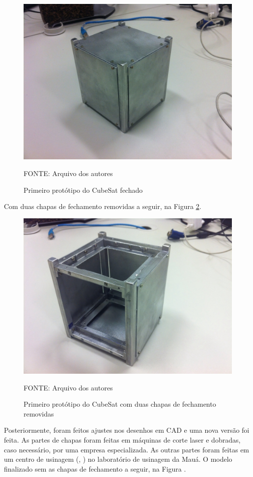 \documentclass[
	12pt,				%
	openany,			%
	twoside,			%
	a4paper,			%
	english,			%
	french,				%
	spanish,			%
	brazil,				%
	oldfontcommands
	]{abntex2}
\begin{document}
\begin{figure}[ht]
	\caption{Primeiro protótipo do CubeSat fechado}
	\centering
	\includegraphics[width=0.7\linewidth]{./figs/PrototypeOne_Full}
	
	\begin{small}
		FONTE: Arquivo dos autores
	\end{small}
	\label{fig:ProtooneF}
\end{figure}

\newpage

Com duas chapas de fechamento removidas a seguir, na Figura \ref{fig:Protoone}.

\begin{figure}[ht]
	\caption{Primeiro protótipo do CubeSat com duas chapas de fechamento removidas}
	\centering
	\includegraphics[width=0.7\linewidth]{./figs/PrototypeOne}
	
	\begin{small}
		FONTE: Arquivo dos autores
	\end{small}
	\label{fig:Protoone}
\end{figure}

Posteriormente, foram feitos ajustes nos desenhos em CAD e uma nova versão foi feita. As partes de chapas foram feitas em máquinas de corte laser e dobradas, caso necessário, por uma empresa especializada. As outras partes foram feitas em um centro de usinagem (, ) no laboratório de usinagem da Mauá. O modelo finalizado sem as chapas de fechamento a seguir, na Figura .
\end{document}
